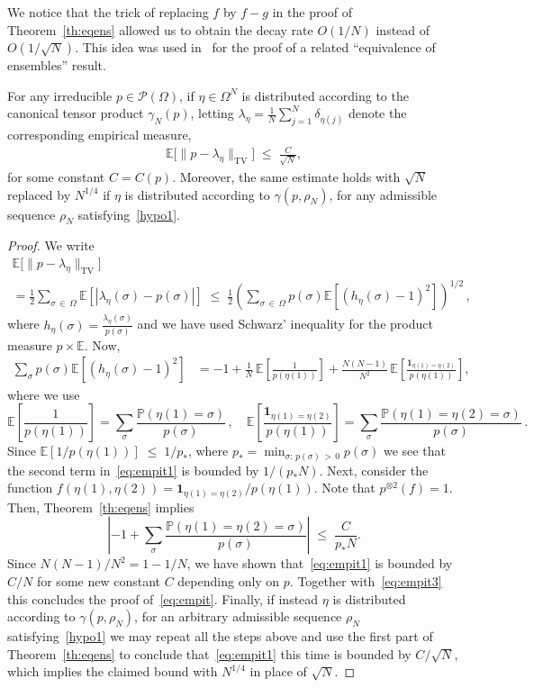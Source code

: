 \documentclass[AHL,Unicode,longabstracts,published]{cedram}
\renewcommand{\leq}{\;\leqslant\;}
\newcommand{\si}{\sigma}
\newcommand{\tv}{\mathrm{TV}}
\newcommand{\ind}{\mathbf{1}}
\newcommand{\cP}{\mathcal{P}}
\newcommand{\bbE}{\mathbb{E}}
\newcommand{\bbP}{\mathbb{P}}
\let\d=\delta
\let\g=\gamma
\let\l=\lambda
\let\r=\rho
\let\O=\Omega
\begin{document}
We notice that the trick of replacing $f$ by $f-g$ in the proof of Theorem~\ref{th:eqens} allowed us to obtain the decay rate $O(1/ N)$ instead of $O(1/ \sqrt N)$. This idea was used in~\cite{asymm} for the proof of a related ``equivalence of ensembles'' result.

\begin{coro}\label{coro3}
For any irreducible $p\in\cP(\O)$, if $\eta\in\O^N$ is distributed according to the canonical tensor product $\g_N(p)$, letting $\l_{\eta}=\frac1N\sum_{j=1}^N\d_{\eta(j)}$ denote the corresponding empirical measure,
\begin{align}\label{eq:empit}
\bbE\Big[\|p-\lambda_{\eta}\|_{\tv}\Big] \leq \frac{C}{\sqrt {N}},
\end{align}
for some constant $C=C(p)$. Moreover, the same estimate holds with $\sqrt N$ replaced by $N^{1/4}$ if $\eta $ is distributed according to $\g(p,\r_N)$, for any admissible sequence $\r_N$ satisfying~\eqref{hypo1}.
\end{coro}


\begin{proof}
We write
\begin{multline}\label{eq:empit3}
\bbE\Big[\|p-\lambda_{\eta}\|_{\tv}\Big] \\ = \frac12\sum_{\si\,\in\,\O}\bbE\left[|\lambda_{\eta}(\si)-p(\si)|\right]
\leq \frac12\left(\sum_{\si\,\in\,\O}p(\si)
\bbE\left[(h_\eta(\si)-1)^2\right]\right)^{1/2}\,,
\end{multline}
where $ h_\eta(\si) =\frac{\lambda_{\eta}(\si)}{p(\si)} $ and we have used Schwarz' inequality for the product measure $p\times \bbE$. Now,
\begin{align}\label{eq:empit1}
\sum_{\si}p(\si)
\bbE\left[(h_\eta(\si)-1)^2\right] & = -1 + \frac1N
\,\bbE\left[\frac{1 }{p(\eta(1))}\right] + \frac{N(N-1)}{N^2}
\,
\bbE\left[\frac{\ind_{\eta(1)=\eta(2)} }{p(\eta(1))}\right],
\end{align}
where we use
\[
\bbE\left[\frac{1 }{p(\eta(1))}\right]=\sum_\si \frac{\bbP(\eta(1)=\si)}{p(\si)} \,,
\quad \bbE\left[\frac{\ind_{\eta(1)=\eta(2)} }{p(\eta(1))}\right] = \sum_\si \frac{\bbP(\eta(1)=\eta(2)=\si)}{p(\si)}\,.
\]
Since $\bbE\left[1/p(\eta(1))\right]\leq 1/p_*$, where $p_*=\min_{\si:\, p(\si)\,>\,0}p(\si)$ we see that the second term in~\eqref{eq:empit1} is bounded by $1/(p_*N)$. Next, consider the function $f(\eta(1),\eta(2))=\ind_{\eta(1)=\eta(2)}/p(\eta(1))$. Note that $p^{\otimes 2}(f) = 1$. Then, Theorem~\ref{th:eqens} implies
\[
\left|-1+\sum_\si\frac{\bbP(\eta(1)=\eta(2)=\si) }{p(\si)}\right|\leq \frac{C}{p_* N}.
\]
Since $N(N-1)/N^2=1-1/N$, we have shown that~\eqref{eq:empit1} is bounded by $C/N$ for some new constant $C$ depending only on $p$. Together with~\eqref{eq:empit3} this concludes the proof of~\eqref{eq:empit}. Finally, if instead $\eta $ is distributed according to $\g(p,\r_N)$, for an arbitrary admissible sequence $\r_N$ satisfying~\eqref{hypo1} we may repeat all the steps above and use the first part of Theorem~\ref{th:eqens} to conclude that~\eqref{eq:empit1} this time is bounded by $C/\sqrt N$, which implies the claimed bound with $N^{1/4}$ in place of $\sqrt N$.
\end{proof}
\end{document}

